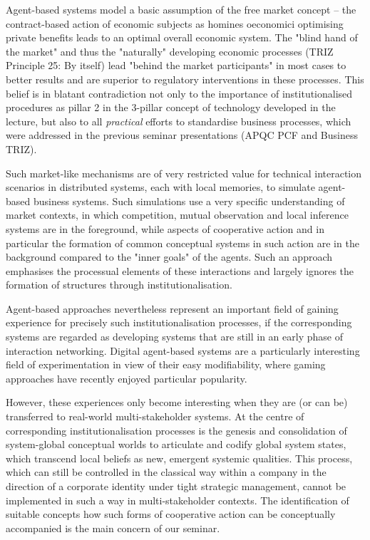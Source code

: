 \documentclass[11pt,a4paper]{article}
\begin{document}
Agent-based systems model a basic assumption of the free market concept -- the
contract-based action of economic subjects as homines oeconomici optimising
private benefits leads to an optimal overall economic system. The "blind hand
of the market" and thus the "naturally" developing economic processes (TRIZ
Principle 25: By itself) lead "behind the market participants" in most cases
to better results and are superior to regulatory interventions in these
processes. This belief is in blatant contradiction not only to the importance
of institutionalised procedures as pillar 2 in the 3-pillar concept of
technology developed in the lecture, but also to all \emph{practical} efforts
to standardise business processes, which were addressed in the previous
seminar presentations (APQC PCF and Business TRIZ).

Such market-like mechanisms are of very restricted value for technical
interaction scenarios in distributed systems, each with local memories, to
simulate agent-based business systems. Such simulations use a very specific
understanding of market contexts, in which competition, mutual observation and
local inference systems are in the foreground, while aspects of cooperative
action and in particular the formation of common conceptual systems in such
action are in the background compared to the "inner goals" of the agents. Such
an approach emphasises the processual elements of these interactions and
largely ignores the formation of structures through institutionalisation.

Agent-based approaches nevertheless represent an important field of gaining
experience for precisely such institutionalisation processes, if the
corresponding systems are regarded as developing systems that are still in an
early phase of interaction networking. Digital agent-based systems are a
particularly interesting field of experimentation in view of their easy
modifiability, where gaming approaches have recently enjoyed particular
popularity.

However, these experiences only become interesting when they are (or can be)
transferred to real-world multi-stakeholder systems. At the centre of
corresponding institutionalisation processes is the genesis and consolidation
of system-global conceptual worlds to articulate and codify global system
states, which transcend local beliefs as new, emergent systemic qualities.
This process, which can still be controlled in the classical way within a
company in the direction of a corporate identity under tight strategic
management, cannot be implemented in such a way in multi-stakeholder contexts.
The identification of suitable concepts how such forms of cooperative action
can be conceptually accompanied is the main concern of our seminar.
\end{document}
